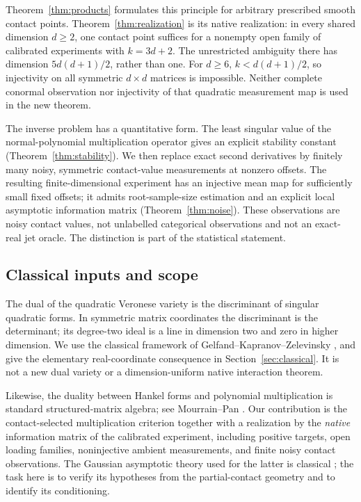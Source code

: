 \documentclass[11pt,reqno]{amsart}
\numberwithin{equation}{section}
\theoremstyle{definition}\newtheorem{definition}[theorem]{Definition}
\theoremstyle{remark}\newtheorem{remark}[theorem]{Remark}
\begin{document}
Theorem~\ref{thm:products} formulates this principle for arbitrary prescribed smooth contact points. Theorem~\ref{thm:realization} is its native realization: in every shared dimension $d\ge2$, one contact point suffices for a nonempty open family of calibrated experiments with $k=3d+2$. The unrestricted ambiguity there has dimension $5d(d+1)/2$, rather than one. For $d\ge6$, $k<d(d+1)/2$, so injectivity on all symmetric $d\times d$ matrices is impossible. Neither complete conormal observation nor injectivity of that quadratic measurement map is used in the new theorem.

The inverse problem has a quantitative form. The least singular value of the normal-polynomial multiplication operator gives an explicit stability constant (Theorem~\ref{thm:stability}). We then replace exact second derivatives by finitely many noisy, symmetric contact-value measurements at nonzero offsets. The resulting finite-dimensional experiment has an injective mean map for sufficiently small fixed offsets; it admits root-sample-size estimation and an explicit local asymptotic information matrix (Theorem~\ref{thm:noise}). These observations are noisy contact values, not unlabelled categorical observations and not an exact-real jet oracle. The distinction is part of the statistical statement.

\subsection*{Classical inputs and scope}
The dual of the quadratic Veronese variety is the discriminant of singular quadratic forms. In symmetric matrix coordinates the discriminant is the determinant; its degree-two ideal is a line in dimension two and zero in higher dimension. We use the classical framework of Gelfand--Kapranov--Zelevinsky \cite{GKZ}, and give the elementary real-coordinate consequence in Section~\ref{sec:classical}. It is not a new dual variety or a dimension-uniform native interaction theorem.

Likewise, the duality between Hankel forms and polynomial multiplication is standard structured-matrix algebra; see Mourrain--Pan \cite{MP}. Our contribution is the contact-selected multiplication criterion together with a realization by the \emph{native} information matrix of the calibrated experiment, including positive targets, open loading families, noninjective ambient measurements, and finite noisy contact observations. The Gaussian asymptotic theory used for the latter is classical \cite{vdV}; the task here is to verify its hypotheses from the partial-contact geometry and to identify its conditioning.
\end{document}
